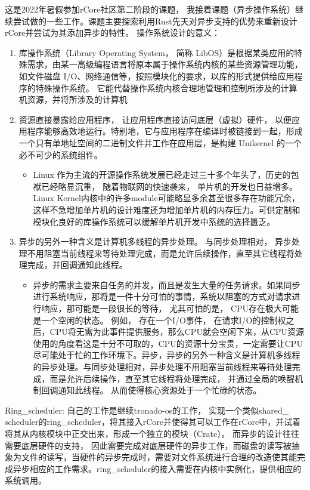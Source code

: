 这是2022年暑假参加rCore社区第二阶段的课题， 我接着课题（异步操作系统）继续尝试做的一些工作。课题主要探索利用Rust先天对异步支持的优势来重新设计rCore并尝试为其添加异步的特性。
操作系统设计的意义：
\begin{enumerate}
\item 库操作系统（Library Operating System， 简称 LibOS）是根据某类应用的特殊需求，由某一高级编程语言将原本属于操作系统内核的某些资源管理功能，如文件磁盘 I/O、网络通信等，按照模块化的要求，以库的形式提供给应用程序的特殊操作系统。
它能代替操作系统内核合理地管理和控制所涉及的计算机资源，并将所涉及的计算机
\item 资源直接暴露给应用程序， 让应用程序直接访问底层（虚拟）硬件， 以便应用程序能够高效地运行。特别地，它与应用程序在编译时被链接到一起，形成一个只有单地址空间的二进制文件并工作在应用层，是构建 Unikernel 的一个必不可少的系统组件。
    \begin{itemize}
        \item Linux 作为主流的开源操作系统发展已经走过三十多个年头了，历史的包袱已经略显沉重， 随着物联网的快速袭来， 单片机的开发也日益增多。 Linux Kernel内核中的许多module可能略显多余甚至很多存在功能冗余， 这样不急增加单片机的设计难度还为增加单片机的内存压力。可供定制和模块化良好的库操作系统可以缓解单片机开发中系统的选择匮乏。
    \end{itemize}
\item 异步的另外一种含义是计算机多线程的异步处理。 与同步处理相对， 异步处理不用阻塞当前线程来等待处理完成，而是允许后续操作，直至其它线程将处理完成，并回调通知此线程。
    \begin{itemize}
    \item 异步的需求主要来自任务的并发，而且是发生大量的任务请求。如果同步进行系统响应，那将是一件十分可怕的事情，系统以阻塞的方式对请求进行响应，那可能是一段很长的等待， 尤其可怕的是， CPU存在极大可能是一个空闲的状态。 例如， 存在一个I/O事件， 在请求I/O的控制权之后，CPU将无需为此事件提供服务，那么CPU就会空闲下来，从CPU资源使用的角度看这是十分不可取的，CPU的资源十分宝贵，一定需要让CPU尽可能处于忙的工作环境下。异步，异步的另外一种含义是计算机多线程的异步处理。与同步处理相对，异步处理不用阻塞当前线程来等待处理完成，而是允许后续操作，直至其它线程将处理完成， 并通过全局的唤醒机制回调通知此线程。 从而使得核心资源处于一个忙碌的状态。
    \end{itemize}
\end{enumerate}

Ring\_scheduler: 自己的工作是继续tronado-os的工作， 实现一个类似shared\_ scheduler的ring\_scheduler，将其接入rCore并使得其可以工作在rCore中，并试着将其从内核模块中正交出来，形成一个独立的模块（Crate）。 而异步的设计往往需要底层硬件的支持， 因此需要完成对底层硬件的异步工作，而磁盘的读写被抽象为文件的读写，当硬件的异步完成时，需要对文件系统进行合理的改造使其能完成异步相应的工作需求。ring\_scheduler的接入需要在内核中实例化，提供相应的系统调用。

